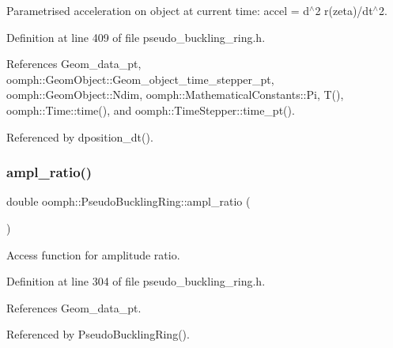 Parametrised acceleration on object at current time\+: accel = d$^\wedge$2 r(zeta)/dt$^\wedge$2. 



Definition at line 409 of file pseudo\+\_\+buckling\+\_\+ring.\+h.



References Geom\+\_\+data\+\_\+pt, oomph\+::\+Geom\+Object\+::\+Geom\+\_\+object\+\_\+time\+\_\+stepper\+\_\+pt, oomph\+::\+Geom\+Object\+::\+Ndim, oomph\+::\+Mathematical\+Constants\+::\+Pi, T(), oomph\+::\+Time\+::time(), and oomph\+::\+Time\+Stepper\+::time\+\_\+pt().



Referenced by dposition\+\_\+dt().

\mbox{\label{classoomph_1_1PseudoBucklingRing_ade2881e77f7cf0be26970c78c70d3a4d}} 
\subsubsection{\texorpdfstring{ampl\+\_\+ratio()}{ampl\_ratio()}}
{\footnotesize\ttfamily double oomph\+::\+Pseudo\+Buckling\+Ring\+::ampl\+\_\+ratio (\begin{DoxyParamCaption}{ }\end{DoxyParamCaption})\hspace{0.3cm}{\ttfamily [inline]}}



Access function for amplitude ratio. 



Definition at line 304 of file pseudo\+\_\+buckling\+\_\+ring.\+h.



References Geom\+\_\+data\+\_\+pt.



Referenced by Pseudo\+Buckling\+Ring().

\mbox{\label{classoomph_1_1PseudoBucklingRing_aa11d7bbd2d01a646200e8719e61ad09a}} 
